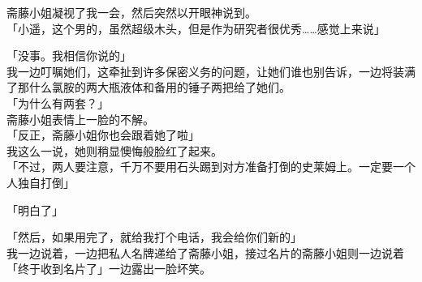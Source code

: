 斋藤小姐凝视了我一会，然后突然以开眼神说到。\\

「小遥，这个男的，虽然超级木头，但是作为研究者很优秀……感觉上来说」

「没事。我相信你说的」\\

我一边叮嘱她们，这牵扯到许多保密义务的问题，让她们谁也别告诉，一边将装满了那什么氯胺的两大瓶液体和备用的锤子两把给了她们。\\

「为什么有两套？」\\

斋藤小姐表情上一脸的不解。\\

「反正，斋藤小姐你也会跟着她了啦」\\

我这么一说，她则稍显懊悔般脸红了起来。\\

「不过，两人要注意，千万不要用石头踢到对方准备打倒的史莱姆上。一定要一个人独自打倒」

「明白了」

「然后，如果用完了，就给我打个电话，我会给你们新的」\\

我一边说着，一边把私人名牌递给了斋藤小姐，接过名片的斋藤小姐则一边说着「终于收到名片了」一边露出一脸坏笑。\\

